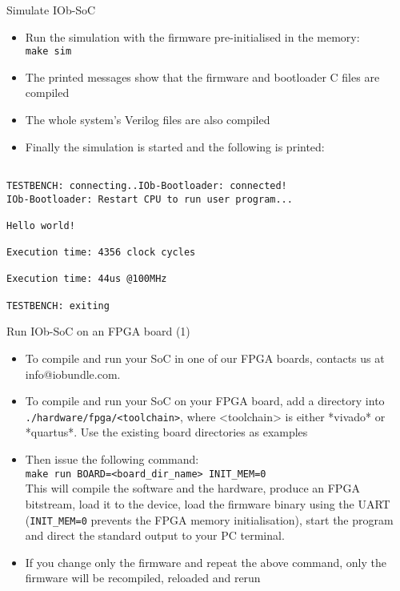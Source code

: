 \documentclass [xcolor=svgnames, t] {beamer}
\begin{document}
\begin{frame}[fragile]{Simulate IOb-SoC}
\begin{itemize}
\item Run the simulation with the firmware pre-initialised in the memory:\\
  {\tt make sim}
\item The printed messages show that the firmware and bootloader C files are compiled
\item The whole system's Verilog files are also compiled
\item Finally the simulation is started and the following is printed:
\end{itemize}

\begin{tiny}
  \begin{lstlisting}

TESTBENCH: connecting..IOb-Bootloader: connected!
IOb-Bootloader: Restart CPU to run user program...

Hello world!

Execution time: 4356 clock cycles

Execution time: 44us @100MHz

TESTBENCH: exiting

  \end{lstlisting}
\end{tiny}
\end{frame}


\begin{frame}{Run IOb-SoC on an FPGA board (1)}
\begin{itemize}
\item To compile and run your SoC in one of our FPGA boards, contacts us at info@iobundle.com.
\item To compile and run your SoC on your FPGA board, add a directory into {\tt ./hardware/fpga/<toolchain>}, where <toolchain> is either *vivado* or *quartus*. Use the existing board directories as examples
\item Then issue the following command:\\
  {\tt make run BOARD=<board\_dir\_name> INIT\_MEM=0}\\
  This will compile the software and the hardware, produce an FPGA bitstream,
  load it to the device, load the firmware binary using the UART ({\tt INIT\_MEM=0} prevents the FPGA memory initialisation), start the
  program and direct the standard output to your PC terminal.
\item If you change only the firmware and repeat the above command, only the
  firmware will be recompiled, reloaded and rerun
\end{itemize}
\end{frame}
\end{document}
